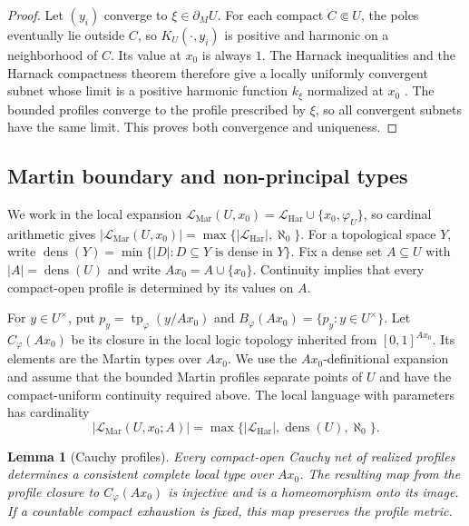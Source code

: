 \documentclass{amsart}
\newtheorem{lemma}[theorem]{Lemma}
\theoremstyle{definition}
\theoremstyle{remark}
\numberwithin{equation}{section}
\begin{document}
\begin{proof}
	Let $(y_i)$ converge to $\xi\in\partial_MU$. For each compact
	$C\Subset U$, the poles eventually lie outside $C$, so
	$K_{U}(\cdot,y_i)$ is positive and harmonic on a neighborhood of
	$C$. Its value at $x_0$ is always $1$. The Harnack inequalities and
	the Harnack compactness theorem therefore give a locally uniformly
	convergent subnet whose limit is a positive harmonic function
	$k_\xi$ normalized at $x_0$ \cite[Theorem~1]{LW1965axiomatic}. The bounded profiles converge to
	the profile prescribed by $\xi$, so all convergent subnets have the
	same limit. This proves both convergence and uniqueness.
\end{proof}




\subsection{Martin boundary and non-principal types}
We work in the local expansion $\mathcal L_{\mathrm{Mar}}(U,x_0)=\mathcal L_{\mathrm{Har}}\cup\{x_0,\varphi_U\}$, so cardinal arithmetic gives $|\mathcal L_{\mathrm{Mar}}(U,x_0)|=\max\{|\mathcal L_{\mathrm{Har}}|,\aleph_0\}$. For a topological space $Y$, write $\operatorname{dens}(Y)=\min\{|D|:D\subseteq Y\text{ is dense in }Y\}$. Fix a dense set $A\subseteq U$ with $|A|=\operatorname{dens}(U)$ and write $Ax_0=A\cup\{x_0\}$. Continuity implies that every compact-open profile is determined by its values on $A$.

For $y\in U^\times$, put $p_y=\operatorname{tp}_\varphi(y/Ax_0)$ and $B_\varphi(Ax_0)=\{p_y:y\in U^\times\}$. Let $C_\varphi(Ax_0)$ be its closure in the local logic topology inherited from $[0,1]^{Ax_0}$. Its elements are the Martin types over $Ax_0$. We use the $Ax_0$-definitional expansion and assume that the bounded Martin profiles separate points of $U$ and have the compact-uniform continuity required above. The local language with parameters has cardinality
$$|\mathcal L_{\mathrm{Mar}}(U,x_0;A)|=\max\{|\mathcal L_{\mathrm{Har}}|,\operatorname{dens}(U),\aleph_0\}.$$

\begin{lemma}[Cauchy profiles]
	\label{lem:Martin-Cauchy-profile-type}
	Every compact-open Cauchy net of realized profiles determines a consistent complete local type over $Ax_0$. The resulting map from the profile closure to $C_\varphi(Ax_0)$ is injective and is a homeomorphism onto its image. If a countable compact exhaustion is fixed, this map preserves the profile metric.
\end{lemma}
\end{document}
